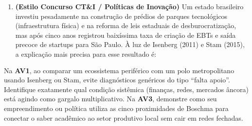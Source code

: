 \begin{enumerate}[leftmargin=1.6em, itemsep=8pt]
  \item \textbf{(Estilo Concurso CT\&I / Políticas de Inovação)} Um estado brasileiro investiu pesadamente na construção de prédios de parques tecnológicos (infraestrutura física) e na reforma de leis estaduais de desburocratização, mas após cinco anos registrou baixíssima taxa de criação de EBTs e saída precoce de startups para São Paulo. À luz de Isenberg (2011) e Stam (2015), a explicação mais precisa para esse resultado é:
\end{enumerate}

\begin{boxDica}
Na \textbf{AV1}, ao comparar um ecossistema periférico com um polo metropolitano usando Isenberg ou Stam, evite diagnósticos genéricos do tipo ``falta apoio''. Identifique exatamente qual condição sistêmica (finanças, redes, mercados âncora) está agindo como gargalo multiplicativo. Na \textbf{AV3}, demonstre como seu empreendimento ou política utiliza as cinco proximidades de Boschma para conectar o saber acadêmico ao setor produtivo local sem cair em redes fechadas.
\end{boxDica}

\clearpage
{}

